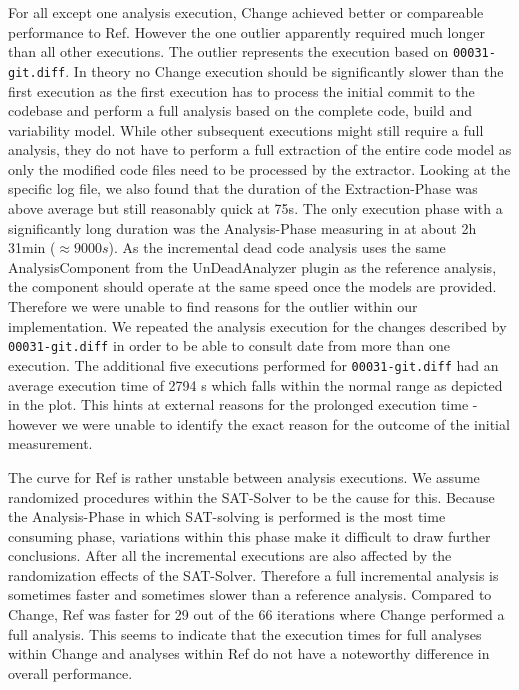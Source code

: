 \documentclass[a4paper]{article}
\begin{document}
For all except one analysis execution, Change achieved better or compareable performance to Ref. However the one outlier apparently required much longer than all other executions. The outlier represents the execution based on \texttt{00031-git.diff}. In theory no Change execution should be significantly slower than the first execution as the first execution has to process the initial commit to the codebase and perform a full analysis based on the complete code, build and variability model. While other subsequent executions might still require a full analysis, they do not have to perform a full extraction of the entire code model as only the modified code files need to be processed by the extractor. 
Looking at the specific log file, we also found that the duration of the Extraction-Phase was above average but still reasonably quick at 75s. The only execution phase with a significantly long duration was the Analysis-Phase measuring in at about 2h 31min ($\approx 9000s$). As the incremental dead code analysis uses the same AnalysisComponent from the UnDeadAnalyzer plugin as the reference analysis, the component should operate at the same speed once the models are provided. Therefore we were unable to find reasons for the outlier within our implementation. We repeated the analysis execution for the changes described by \texttt{00031-git.diff} in order to be able to consult date from more than one execution. The additional five executions performed for \texttt{00031-git.diff} had an average execution time of 2794 s which falls within the normal range as depicted in the plot. This hints at external reasons for the prolonged execution time - however we were unable to identify the exact reason for the outcome of the initial measurement.

The curve for Ref is rather unstable between analysis executions. We assume randomized procedures within the SAT-Solver to be the cause for this. Because the Analysis-Phase in which SAT-solving is performed is the most time consuming phase, variations within this phase make it difficult to draw further conclusions. After all the incremental executions are also affected by the randomization effects of the SAT-Solver. Therefore a full incremental analysis is sometimes faster and sometimes slower than a reference analysis. Compared to Change, Ref was faster for 29 out of the 66 iterations where Change performed a full analysis. This seems to indicate that the execution times for full analyses within Change and analyses within Ref do not have a noteworthy difference in overall performance.
\end{document}
